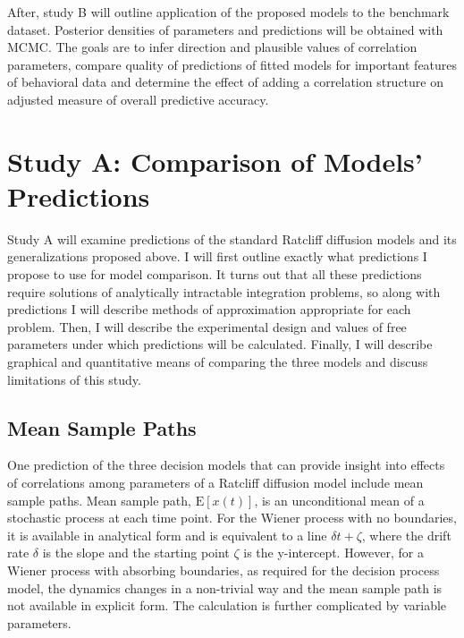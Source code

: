 \documentclass[12pt]{report}
\begin{document}
After, study B will outline application of the proposed models to the benchmark dataset. Posterior densities of parameters and predictions will be obtained with MCMC. The goals are to infer direction and plausible values of correlation parameters, compare quality of predictions of fitted models for important features of behavioral data and determine the effect of adding a correlation structure on adjusted measure of overall predictive accuracy.

\section{Study A: Comparison of Models' Predictions}

Study A will examine predictions of the standard Ratcliff diffusion models and its generalizations proposed above. I will first outline exactly what predictions I propose to use for model comparison. It turns out that all these predictions require solutions of analytically intractable integration problems, so along with predictions I will describe methods of approximation appropriate for each problem. Then, I will describe the experimental design and values of free parameters under which predictions will be calculated. Finally, I will describe graphical and quantitative means of comparing the three models and discuss limitations of this study.

\subsection{Mean Sample Paths}

One prediction of the three decision models that can provide insight into effects of correlations among parameters of a Ratcliff diffusion model include mean sample paths. Mean sample path, $\mathrm{E}[x(t)]$, is an unconditional mean of a stochastic process at each time point. For the Wiener process with no boundaries, it is available in analytical form and is equivalent to a line $\delta t + \zeta$, where the drift rate $\delta$ is the slope and the starting point $\zeta$ is the y-intercept. However, for a Wiener process with absorbing boundaries, as required for the decision process model, the dynamics changes in a non-trivial way and the mean sample path is not available in explicit form. The calculation is further complicated by variable parameters.
\end{document}
